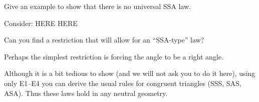 \documentclass{ximera}
\begin{document}
\begin{question}
Give an example to show that there is no universal SSA law.
\begin{solution}
\begin{freeResponse}
Consider:
HERE HERE
\end{freeResponse}
\end{solution}
Can you find a restriction that will allow for an ``SSA-type'' law?
\begin{solution}
Perhaps the simplest restriction is forcing the angle to be a right
angle.
\end{solution}
\end{question}

Although it is a bit tedious to show (and we will not ask you to do it
here), using only E1--E4 you can derive the usual rules for congruent
triangles (SSS, SAS, ASA). Thus these laws hold in any neutral
geometry.
\end{document}
